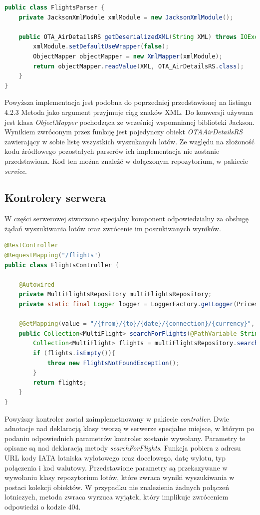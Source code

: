 \documentclass[12pt, twoside]{report}
\begin{document}
\begin{lstlisting}[language=java, caption=Implementacja parsowania treści XML]
public class FlightsParser {
    private JacksonXmlModule xmlModule = new JacksonXmlModule();

    public OTA_AirDetailsRS getDeserializedXML(String XML) throws IOException {
        xmlModule.setDefaultUseWrapper(false);
        ObjectMapper objectMapper = new XmlMapper(xmlModule);
        return objectMapper.readValue(XML, OTA_AirDetailsRS.class);
    }
}

\end{lstlisting}
Powyższa implementacja jest podobna do poprzedniej przedstawionej na listingu 4.2.3 Metoda jako argument przyjmuje ciąg znaków XML. Do konwersji używana jest klasa \textit{ObjectMapper} pochodząca ze wcześniej wspomnianej biblioteki Jackson. Wynikiem zwróconym przez funkcję jest pojedynczy obiekt \textit{OTAAirDetailsRS} zawierający w sobie listę wszystkich wyszukanych lotów.
Ze względu na złożoność kodu źródłowego pozostałych parserów ich implementacja nie zostanie przedstawiona. Kod ten można znaleźć w dołączonym repozytorium, w pakiecie \textit{service}.
\newpage
\subsection{Kontrolery serwera}
W części serwerowej stworzono specjalny komponent odpowiedzialny za obsługę żądań wyszukiwania lotów oraz zwrócenie im poszukiwanych wyników. 
\begin{lstlisting}[language=java, caption=Implementacja parsowania treści XML]
@RestController
@RequestMapping("/flights")
public class FlightsController {

    @Autowired
    private MultiFlightsRepository multiFlightsRepository;
    private static final Logger logger = LoggerFactory.getLogger(PricesRepository.class);

    @GetMapping(value = "/{from}/{to}/{date}/{connection}/{currency}", produces = MediaType.APPLICATION_JSON_VALUE)
    public Collection<MultiFlight> searchForFlights(@PathVariable String from, @PathVariable String to, @PathVariable String date, @PathVariable String connection, @PathVariable String currency) throws AirportsNotFoundException, IOException {
        Collection<MultiFlight> flights = multiFlightsRepository.searchForMultiFlights(from, to, date, connection, currency);
        if (flights.isEmpty()){
            throw new FlightsNotFoundException();
        }
        return flights;
    }
}
\end{lstlisting}
Powyższy kontroler został zaimplemetnowany w pakiecie \textit{controller}. Dwie adnotacje nad deklaracją klasy tworzą w serwerze specjalne miejsce, w którym po podaniu odpowiednich parametrów kontroler zostanie wywołany. Parametry te opisane są nad deklaracją metody \textit{searchForFlights}. Funkcja pobiera z adresu URL kody IATA lotniska wylotowego oraz docelowego, datę wylotu, typ połączenia i kod walutowy. Przedstawione parametry są przekazywane w wywołaniu klasy repozytorium lotów, które zwraca wyniki wyszukiwania w postaci kolekcji obiektów. W przypadku nie znalezienia żadnych połączeń lotniczych, metoda zwraca wyrzuca wyjątek, który implikuje zwróceniem odpowiedzi o kodzie 404.
\end{document}
